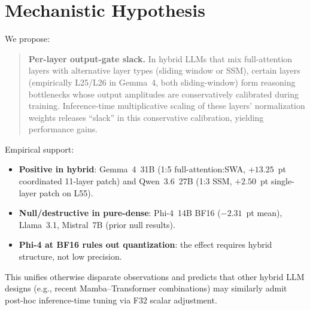 \documentclass[11pt]{article}
\begin{document}
\section{Mechanistic Hypothesis}
\label{sec:mechanism}

We propose:
\begin{quote}
\textbf{Per-layer output-gate slack.} In hybrid LLMs that mix full-attention layers with alternative layer types (sliding window or SSM), certain layers (empirically L25/L26 in Gemma~4, both sliding-window) form reasoning bottlenecks whose output
amplitudes are conservatively calibrated during training. Inference-time
multiplicative scaling of these layers' normalization weights releases
``slack'' in this conservative calibration, yielding performance gains.
\end{quote}

Empirical support:
\begin{itemize}[leftmargin=*,itemsep=0pt]
  \item \textbf{Positive in hybrid}: Gemma~4~31B (1:5 full-attention:SWA, $+13.25$~pt
  coordinated 11-layer patch) and Qwen~3.6~27B (1:3 SSM, $+2.50$~pt
  single-layer patch on L55).
  \item \textbf{Null/destructive in pure-dense}: Phi-4~14B BF16
  ($-2.31$~pt mean), Llama~3.1, Mistral~7B (prior null results).
  \item \textbf{Phi-4 at BF16 rules out quantization}: the effect requires
  hybrid structure, not low precision.
\end{itemize}

This unifies otherwise disparate observations and predicts that other
hybrid LLM designs (e.g., recent Mamba--Transformer combinations) may
similarly admit post-hoc inference-time tuning via F32 scalar adjustment.
\end{document}
